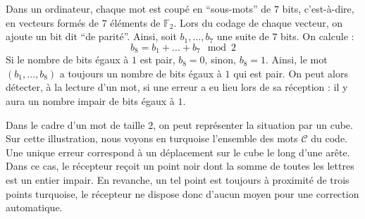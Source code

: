   \begin{example}
    Dans un ordinateur, chaque mot est coupé en ``sous-mots'' de $7$ bits, c'est-à-dire, en vecteurs formés de $7$ éléments de $\mathbb{F}_2$. Lors du codage de chaque vecteur, on ajoute un bit dit ``de parité''.
    \newpar
    Ainsi, soit $b_1, \dots, b_7$ une suite de $7$ bits. On calcule :
    \[ b_8 = b_1 + \dots + b_7 \mod 2 \]
    Si le nombre de bits égaux à $1$ est pair, $b_8 = 0$, sinon, $b_8 = 1$. Ainsi, le mot $(b_1, \dots, b_8)$ a toujours un nombre de bits égaux à $1$ qui est pair. On peut alors détecter, à la lecture d'un mot, si une erreur a eu lieu lors de sa réception : il y aura un nombre impair de bits égaux à $1$.
    \newpar
    \begin{minipage}{0.45\textwidth}
      Dans le cadre d'un mot de taille $2$, on peut représenter la situation par un cube. Sur cette illustration, nous voyons en turquoise l'ensemble des mots $\mathcal{C}$ du code. Une unique erreur correspond à un déplacement sur le cube le long d'une arête. Dans ce cas, le récepteur reçoit un point noir dont la somme de toutes les lettres est un entier impair. En revanche, un tel point est toujours à proximité de trois points turquoise, le récepteur ne dispose donc d'aucun moyen pour une correction automatique.
    \end{minipage}
    \hfill
    \begin{minipage}{0.45\textwidth}
      \begin{figure}[H]
        \begin{center}
\end{center}
\end{figure}
\end{minipage}
\end{example}
